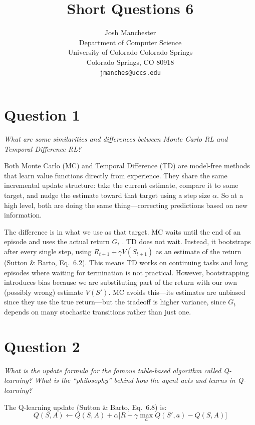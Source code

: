 \documentclass[letterpaper]{article}
\title{Short Questions 6}
\author{
    Josh Manchester\\
    Department of Computer Science\\
    University of Colorado Colorado Springs\\
    Colorado Springs, CO 80918\\
    \texttt{jmanches@uccs.edu}
}
\begin{document}
\maketitle

\section*{Question 1}
\textit{What are some similarities and differences between Monte Carlo RL and Temporal Difference RL?}

\vspace{0.5em}

Both Monte Carlo (MC) and Temporal Difference (TD) are model-free methods that learn value functions directly from experience. They share the same incremental update structure: take the current estimate, compare it to some target, and nudge the estimate toward that target using a step size $\alpha$. So at a high level, both are doing the same thing---correcting predictions based on new information.

The difference is in what we use as that target. MC waits until the end of an episode and uses the actual return $G_t$ \citep{sutton2018reinforcement}. TD does not wait. Instead, it bootstraps after every single step, using $R_{t+1} + \gamma V(S_{t+1})$ as an estimate of the return (Sutton \& Barto, Eq.~6.2). This means TD works on continuing tasks and long episodes where waiting for termination is not practical. However, bootstrapping introduces bias because we are substituting part of the return with our own (possibly wrong) estimate $V(S')$. MC avoids this---its estimates are unbiased since they use the true return---but the tradeoff is higher variance, since $G_t$ depends on many stochastic transitions rather than just one.

\section*{Question 2}
\textit{What is the update formula for the famous table-based algorithm called Q-learning? What is the ``philosophy'' behind how the agent acts and learns in Q-learning?}

\vspace{0.5em}

The Q-learning update (Sutton \& Barto, Eq.~6.8) is:
\begin{equation}
Q(S,A) \leftarrow Q(S,A) + \alpha\bigl[R + \gamma \max_{a} Q(S',a) - Q(S,A)\bigr]
\end{equation}
\end{document}
